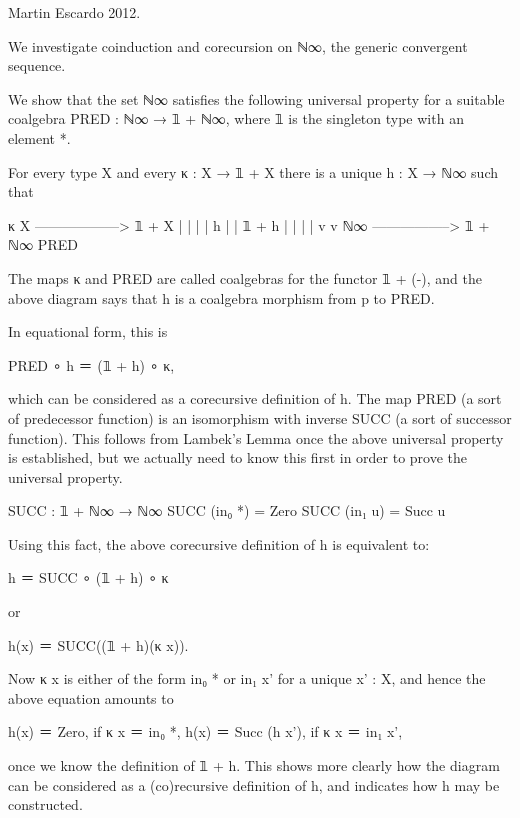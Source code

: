 Martin Escardo 2012.

We investigate coinduction and corecursion on ℕ∞, the generic
convergent sequence.

We show that the set ℕ∞ satisfies the following universal property for
a suitable coalgebra PRED : ℕ∞ → 𝟙 + ℕ∞, where 𝟙 is the singleton type
with an element *.

For every type X and every κ : X → 𝟙 + X there is a unique h : X → ℕ∞
such that

                        κ
             X ------------------> 𝟙 + X
             |                       |
             |                       |
          h  |                       | 𝟙 + h
             |                       |
             |                       |
             v                       v
             ℕ∞ -----------------> 𝟙 + ℕ∞
                       PRED

The maps κ and PRED are called coalgebras for the functor 𝟙 + (-),
and the above diagram says that h is a coalgebra morphism from p to
PRED.

In equational form, this is

             PRED ∘ h ＝ (𝟙 + h) ∘ κ,

which can be considered as a corecursive definition of h.  The map
PRED (a sort of predecessor function) is an isomorphism with
inverse SUCC (a sort of successor function). This follows from
Lambek's Lemma once the above universal property is established, but
we actually need to know this first in order to prove the universal
property.

             SUCC : 𝟙 + ℕ∞ → ℕ∞
             SUCC (in₀ *) = Zero
             SUCC (in₁ u) = Succ u

Using this fact, the above corecursive definition of h is equivalent
to:

             h ＝ SUCC ∘ (𝟙 + h) ∘ κ

or

             h(x) ＝ SUCC((𝟙 + h)(κ x)).

Now κ x is either of the form in₀ * or in₁ x' for a unique x' : X, and
hence the above equation amounts to

             h(x) ＝ Zero,           if κ x ＝ in₀ *,
             h(x) ＝ Succ (h x'),    if κ x ＝ in₁ x',

once we know the definition of 𝟙 + h. This shows more clearly how the
diagram can be considered as a (co)recursive definition of h, and
indicates how h may be constructed.

